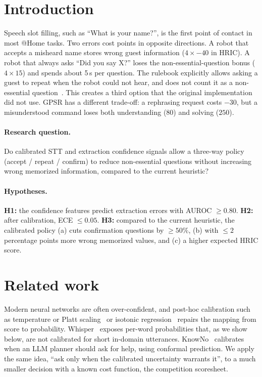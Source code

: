\documentclass[10pt,a4paper]{article}
\begin{document}
\section{Introduction}
Speech slot filling, such as ``What is your name?'', is the first point of contact in most @Home tasks. Two
errors cost points in opposite directions. A robot that accepts a misheard name stores wrong guest information
($4\times-40$ in HRIC). A robot that always asks ``Did you say X?'' loses the non-essential-question bonus
($4\times15$) and spends about 5\,s per question. The rulebook explicitly allows asking a guest to repeat
when the robot could not hear, and does not count it as a non-essential question~\cite{robocup2027rules}.
This creates a third option that the original implementation did not use. GPSR has a different trade-off: a
rephrasing request costs $-30$, but a misunderstood command loses both understanding ($80$) and solving
($250$).

\paragraph{Research question.} Do calibrated STT and extraction confidence signals allow a three-way policy
(accept / repeat / confirm) to reduce non-essential questions without increasing wrong memorized
information, compared to the current heuristic?

\paragraph{Hypotheses.}
\textbf{H1:} the confidence features predict extraction errors with AUROC $\ge 0.80$.
\textbf{H2:} after calibration, ECE $\le 0.05$.
\textbf{H3:} compared to the current heuristic, the calibrated policy (a) cuts confirmation questions by
$\ge 50\%$, (b) with $\le 2$ percentage points more wrong memorized values, and (c) a higher expected HRIC
score.

\section{Related work}
Modern neural networks are often over-confident, and post-hoc calibration such as temperature or Platt
scaling~\cite{platt1999probabilistic,guo2017calibration} or isotonic regression~\cite{zadrozny2002isotonic}
repairs the mapping from score to probability. Whisper~\cite{radford2023whisper} exposes per-word
probabilities that, as we show below, are not calibrated for short in-domain utterances. KnowNo~\cite{ren2023knowno}
calibrates when an LLM planner should ask for help, using conformal prediction. We apply the same idea, ``ask
only when the calibrated uncertainty warrants it'', to a much smaller decision with a known cost function, the
competition scoresheet.
\end{document}

